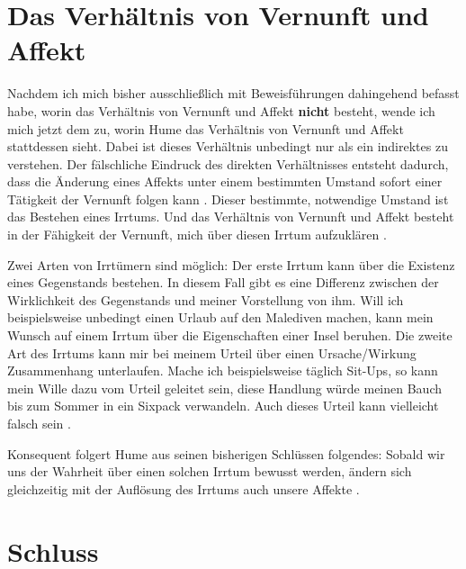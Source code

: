 \documentclass[ngerman,12pt]{diazessay} %
\begin{document}
\begin{doublespace}
\section{Das Verhältnis von Vernunft und Affekt}

Nachdem ich mich bisher ausschließlich mit Beweisführungen dahingehend befasst habe, worin das Verhältnis von Vernunft und Affekt \textbf{nicht} besteht, wende ich mich jetzt dem zu, worin Hume das Verhältnis von Vernunft und Affekt stattdessen sieht. Dabei ist dieses Verhältnis unbedingt nur als ein indirektes zu verstehen. Der fälschliche Eindruck des direkten Verhältnisses entsteht dadurch, dass die Änderung eines Affekts unter einem bestimmten Umstand sofort einer Tätigkeit der Vernunft folgen kann \cite[siehe S.488]{Hume.2013}. Dieser bestimmte, notwendige Umstand ist das Bestehen eines Irrtums. Und das Verhältnis von Vernunft und Affekt besteht in der Fähigkeit der Vernunft, mich über diesen Irrtum aufzuklären \cite[siehe S.536]{Hume.2013}.
\par\bigskip   
Zwei Arten von Irrtümern sind möglich: Der erste Irrtum kann über die Existenz eines Gegenstands bestehen. In diesem Fall gibt es eine Differenz zwischen der Wirklichkeit des Gegenstands und meiner Vorstellung von ihm. Will ich beispielsweise unbedingt einen Urlaub auf den Malediven machen, kann mein Wunsch auf einem Irrtum über die Eigenschaften einer Insel beruhen. Die zweite Art des Irrtums kann mir bei meinem Urteil über einen Ursache/Wirkung Zusammenhang unterlaufen. Mache ich beispielsweise täglich Sit-Ups, so kann mein Wille dazu vom Urteil geleitet sein, diese Handlung würde meinen Bauch bis zum Sommer in ein Sixpack verwandeln. Auch dieses Urteil kann vielleicht falsch sein \cite[siehe S.536]{Hume.2013}.
\par\bigskip   
Konsequent folgert Hume aus seinen bisherigen Schlüssen folgendes: Sobald wir uns der Wahrheit über einen solchen Irrtum bewusst werden, ändern sich gleichzeitig mit der Auflösung des Irrtums auch unsere Affekte \cite[siehe S.488]{Hume.2013}.


\section{Schluss}


\end{doublespace}
\end{document}
